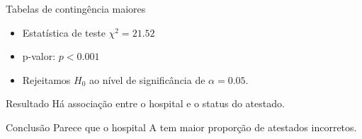 \documentclass{beamer}
\begin{document}

\begin{frame}{\scriptsize Tabelas de contingência maiores}
  \begin{itemize}
    \scriptsize
  \item Estatística de teste $\chi^2 = 21.52$
  \item p-valor: $p<0.001$ %
  \item Rejeitamos $H_0$ ao nível de significância de $\alpha = 0.05$.
  \end{itemize}
  \bigskip
  \begin{exampleblock}{Resultado}
    \footnotesize
    Há associação entre o hospital e o status do atestado.
  \end{exampleblock}
  \begin{exampleblock}{Conclusão}
    \footnotesize
    Parece que o hospital A tem maior proporção de atestados incorretos.
  \end{exampleblock}
\end{frame}


\end{document}
